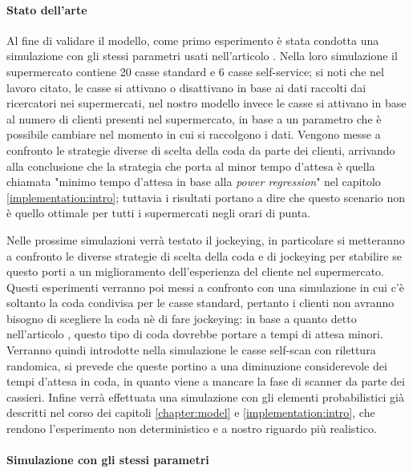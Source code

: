 \paragraph{Stato dell'arte}

Al fine di validare il modello, come primo esperimento è stata condotta una simulazione con gli stessi parametri usati nell'articolo \cite{article1}. Nella loro simulazione il supermercato contiene 20 casse standard e 6 casse self-service; si noti che nel lavoro citato, le casse si attivano o disattivano in base ai dati raccolti dai ricercatori nei supermercati, nel nostro modello invece le casse si attivano in base al numero di clienti presenti nel supermercato, in base a un parametro che è possibile cambiare nel momento in cui si raccolgono i dati. Vengono messe a confronto le strategie diverse di scelta della coda da parte dei clienti, arrivando alla conclusione che la strategia che porta al minor tempo d'attesa è quella chiamata "minimo tempo d'attesa in base alla \textit{power regression}" nel capitolo \ref{implementation:intro}; tuttavia i risultati portano a dire che questo scenario non è quello ottimale per tutti i supermercati negli orari di punta.

Nelle prossime simulazioni verrà testato il jockeying, in particolare si metteranno a confronto le diverse strategie di scelta della coda e di jockeying per stabilire se questo porti a un miglioramento dell'esperienza del cliente nel supermercato. Questi esperimenti verranno poi messi a confronto con una simulazione in cui c'è soltanto la coda condivisa per le casse standard, pertanto i clienti non avranno bisogno di scegliere la coda nè di fare jockeying: in base a quanto detto nell'articolo \cite{yanagisawa2011methods}, questo tipo di coda dovrebbe portare a tempi di attesa minori. 
Verranno quindi introdotte nella simulazione le casse self-scan con rilettura randomica, si prevede che queste portino a una diminuzione considerevole dei tempi d'attesa in coda, in quanto viene a mancare la fase di scanner da parte dei cassieri. Infine verrà effettuata una simulazione con gli elementi probabilistici già descritti nel corso dei capitoli \ref{chapter:model} e \ref{implementation:intro}, che rendono l'esperimento non deterministico e a nostro riguardo più realistico.

\paragraph{Simulazione con gli stessi parametri}

